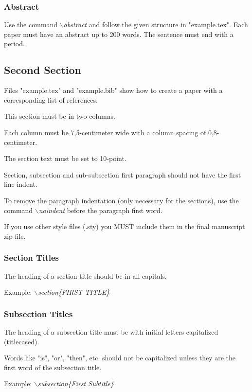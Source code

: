 \documentclass[a4paper,twoside]{article}
\begin{document}
\subsubsection{Abstract}

Use the command \textit{$\backslash$abstract} and follow the given structure in "example.tex".
Each paper must have an abstract up to 200 words. The sentence
must end with a period.

\subsection{Second Section}

Files "example.tex" and "example.bib" show how to create a paper
with a corresponding list of references.

This section must be in two columns.

Each column must be 7,5-centimeter wide with a column spacing
of 0,8-centimeter.

The section text must be set to 10-point.

Section, subsection and sub-subsection first paragraph should not
have the first line indent.

To remove the paragraph indentation (only necessary for the
sections), use the command \textit{$\backslash$noindent} before the
paragraph first word.

If you use other style files (.sty) you MUST include them in the
final manuscript zip file.

\subsubsection{Section Titles}

The heading of a section title should be in all-capitals.

Example: \textit{$\backslash$section\{FIRST TITLE\}}

\vfill
\subsubsection{Subsection Titles}

The heading of a subsection title must be with initial letters
capitalized (titlecased).

Words like "is", "or", "then", etc. should not be capitalized unless
they are the first word of the subsection title.

Example: \textit{$\backslash$subsection\{First Subtitle\}}
\end{document}
